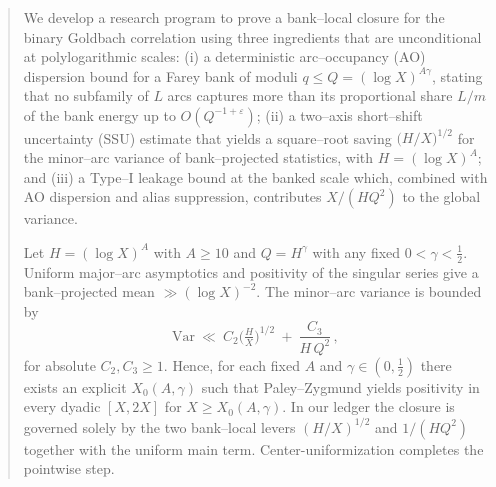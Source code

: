 


\begin{abstract}
We develop a research program to prove a bank--local closure for the binary Goldbach correlation using three ingredients that are unconditional at polylogarithmic scales: (i) a deterministic arc--occupancy (AO) dispersion bound for a Farey bank of moduli $q\le Q=(\log X)^{A\gamma}$, stating that no subfamily of $L$ arcs captures more than its proportional share $L/m$ of the bank energy up to $O(Q^{-1+\varepsilon})$; (ii) a two--axis short--shift uncertainty (SSU) estimate that yields a square--root saving $\big(H/X\big)^{1/2}$ for the minor--arc variance of bank–projected statistics, with $H=(\log X)^A$; and (iii) a Type--I leakage bound at the banked scale which, combined with AO dispersion and alias suppression, contributes $X/(H Q^2)$ to the global variance.

Let $H=(\log X)^A$ with $A\ge 10$ and $Q=H^\gamma$ with any fixed $0<\gamma<\tfrac12$. Uniform major--arc asymptotics and positivity of the singular series give a bank--projected mean $\gg (\log X)^{-2}$. The minor--arc variance is bounded by
\[
\mathrm{Var}\ \ll\ C_2\Big(\tfrac{H}{X}\Big)^{1/2}\ +\ \frac{C_3}{H\,Q^2}\,,
\]
for absolute $C_2,C_3\ge 1$. Hence, for each fixed $A$ and $\gamma\in(0,\tfrac12)$ there exists an explicit $X_0(A,\gamma)$ such that Paley--Zygmund yields positivity in every dyadic $[X,2X]$ for $X\ge X_0(A,\gamma)$. In our ledger the closure is governed solely by the two bank--local levers $(H/X)^{1/2}$ and $1/(H Q^2)$ together with the uniform main term. Center-uniformization completes the pointwise step.

\end{abstract}

\maketitle

